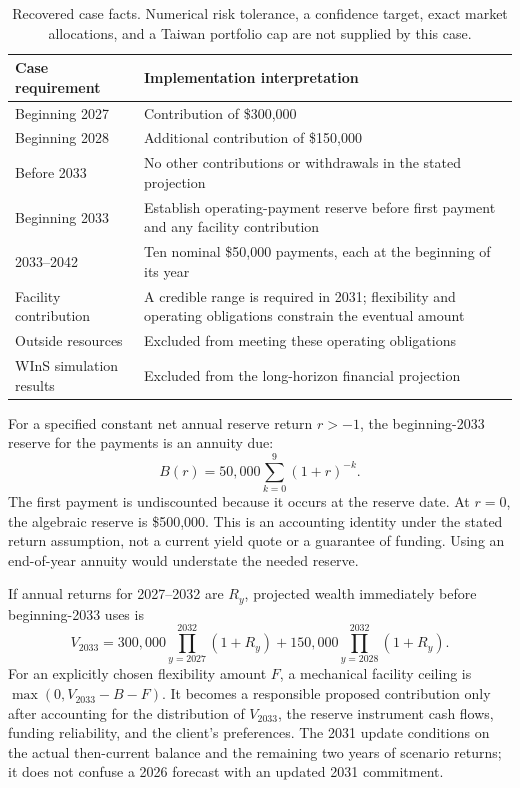 \documentclass[11pt,a4paper]{article}
\begin{document}
\begin{table}[ht]
\centering\small
\begin{tabularx}{\linewidth}{p{.30\linewidth}X}
\toprule Case requirement & Implementation interpretation \\
\midrule Beginning 2027 & Contribution of \$300,000 \\
Beginning 2028 & Additional contribution of \$150,000 \\
Before 2033 & No other contributions or withdrawals in the stated projection \\
Beginning 2033 & Establish operating-payment reserve before first payment and any facility contribution \\
2033--2042 & Ten nominal \$50,000 payments, each at the beginning of its year \\
Facility contribution & A credible range is required in 2031; flexibility and operating obligations constrain the eventual amount \\
Outside resources & Excluded from meeting these operating obligations \\
WInS simulation results & Excluded from the long-horizon financial projection \\
\bottomrule
\end{tabularx}
\caption{Recovered case facts. Numerical risk tolerance, a confidence target, exact market allocations, and a Taiwan portfolio cap are not supplied by this case.}
\end{table}

For a specified constant net annual reserve return $r>-1$, the beginning-2033 reserve for the payments is an annuity due:
\begin{equation}
B(r)=50{,}000\sum_{k=0}^{9}(1+r)^{-k}.
\end{equation}
The first payment is undiscounted because it occurs at the reserve date. At $r=0$, the algebraic reserve is \$500,000. This is an accounting identity under the stated return assumption, not a current yield quote or a guarantee of funding. Using an end-of-year annuity would understate the needed reserve.

If annual returns for 2027--2032 are $R_y$, projected wealth immediately before beginning-2033 uses is
\begin{equation}
V_{2033}=300{,}000\prod_{y=2027}^{2032}(1+R_y)+150{,}000\prod_{y=2028}^{2032}(1+R_y).
\end{equation}
For an explicitly chosen flexibility amount $F$, a mechanical facility ceiling is $\max(0,V_{2033}-B-F)$. It becomes a responsible proposed contribution only after accounting for the distribution of $V_{2033}$, the reserve instrument cash flows, funding reliability, and the client's preferences. The 2031 update conditions on the actual then-current balance and the remaining two years of scenario returns; it does not confuse a 2026 forecast with an updated 2031 commitment.
\end{document}

